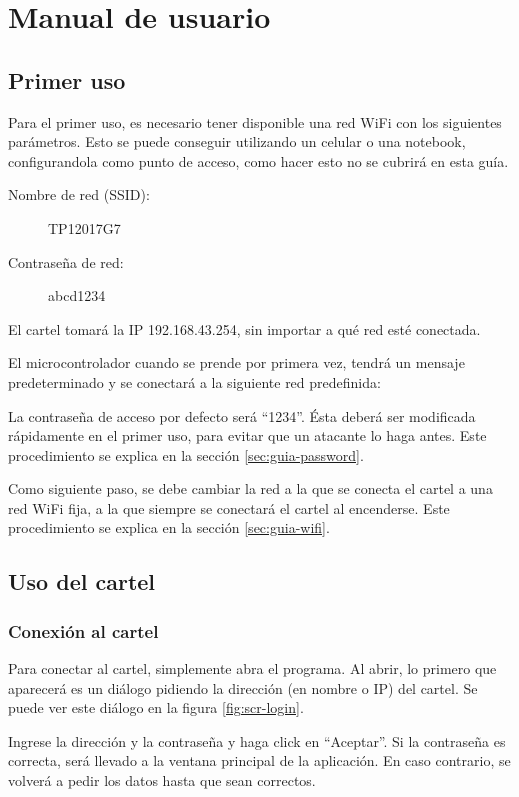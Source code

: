 \section{Manual de usuario} \label{sec:manual-usuario}

\subsection{Primer uso}\label{sec:primer-uso}
Para el primer uso, es necesario tener disponible una red WiFi con los siguientes parámetros. Esto se puede conseguir utilizando un celular o una notebook, configurandola como punto de acceso, como hacer esto no se cubrirá en esta guía.

\begin{description}
	\item[Nombre de red (SSID):] TP12017G7
	\item[Contraseña de red:] abcd1234
\end{description}

El cartel tomará la IP 192.168.43.254, sin importar a qué red esté conectada.

El microcontrolador cuando se prende por primera vez, tendrá un mensaje predeterminado y se conectará a la siguiente red predefinida:

La contraseña de acceso por defecto será \enquote{1234}. Ésta deberá ser modificada rápidamente en el primer uso, para evitar que un atacante lo haga antes. Este procedimiento se explica en la sección \ref{sec:guia-password}.

Como siguiente paso, se debe cambiar la red a la que se conecta el cartel a una red WiFi fija, a la que siempre se conectará el cartel al encenderse. Este procedimiento se explica en la sección \ref{sec:guia-wifi}.

\subsection{Uso del cartel}\label{sec:guia-uso}
\subsubsection{Conexión al cartel}\label{sec:guia-conexion}
Para conectar al cartel, simplemente abra el programa. Al abrir, lo primero que aparecerá es un diálogo pidiendo la dirección (en nombre o IP) del cartel.  Se puede ver este diálogo en la figura \ref{fig:scr-login}.

Ingrese la dirección y la contraseña y haga click en \enquote{Aceptar}. Si la contraseña es correcta, será llevado a la ventana principal de la aplicación. En caso contrario, se volverá a pedir los datos hasta que sean correctos.

